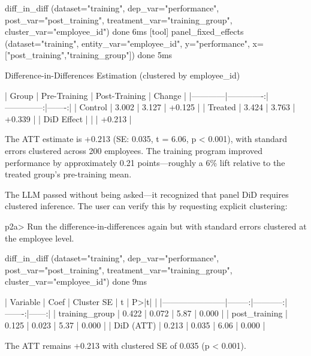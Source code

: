 \begin{Soutput}
  [tool] diff_in_diff (dataset="training", dep_var="performance",
           post_var="post_training", treatment_var="training_group",
           cluster_var="employee_id")                                done 6ms
  [tool] panel_fixed_effects (dataset="training",
           entity_var="employee_id", y="performance",
           x=["post_training","training_group"])                     done 5ms

Difference-in-Differences Estimation (clustered by employee_id)

| Group      | Pre-Training | Post-Training | Change |
|------------|-------------:|--------------:|-------:|
| Control    |        3.002 |         3.127 | +0.125 |
| Treated    |        3.424 |         3.763 | +0.339 |
| DiD Effect |              |               | +0.213 |

The ATT estimate is +0.213 (SE: 0.035, t = 6.06, p < 0.001),
with standard errors clustered across 200 employees. The training
program improved performance by approximately 0.21 points---roughly
a 6\% lift relative to the treated group's pre-training mean.
\end{Soutput}

\noindent The LLM passed  without
being asked---it recognized that panel DiD requires clustered inference.
The user can verify this by requesting explicit clustering:

\begin{Sinput}
p2a> Run the difference-in-differences again but with standard errors
     clustered at the employee level.
\end{Sinput}

\begin{Soutput}
  [tool] diff_in_diff (dataset="training", dep_var="performance",
           post_var="post_training", treatment_var="training_group",
           cluster_var="employee_id")                                done 9ms

| Variable              |    Coef | Cluster SE |      t | P>|t| |
|-----------------------|--------:|-----------:|-------:|------:|
| training_group        |   0.422 |      0.072 |  5.87  | 0.000 |
| post_training         |   0.125 |      0.023 |  5.37  | 0.000 |
| DiD (ATT)             |   0.213 |      0.035 |  6.06  | 0.000 |

The ATT remains +0.213 with clustered SE of 0.035 (p < 0.001).
\end{Soutput}

